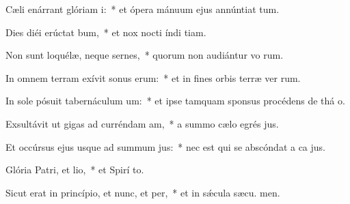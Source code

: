 \item Cæli enárrant glóriam i:~* et ópera mánuum ejus annúntiat tum.
\item Dies diéi erúctat bum,~* et nox nocti índi tiam.
\item Non sunt loquélæ, neque sernes,~* quorum non audiántur vo rum.
\item In omnem terram exívit sonus erum:~* et in fines orbis terræ ver rum.
\item In sole pósuit tabernáculum um:~* et ipse tamquam sponsus procédens de thá o.
\item Exsultávit ut gigas ad curréndam am,~* a summo cælo egrés jus.
\item Et occúrsus ejus usque ad summum jus:~* nec est qui se abscóndat a ca jus.
\item Glória Patri, et lio,~* et Spirí to.
\item Sicut erat in princípio, et nunc, et per,~* et in sǽcula sæcu. men.
